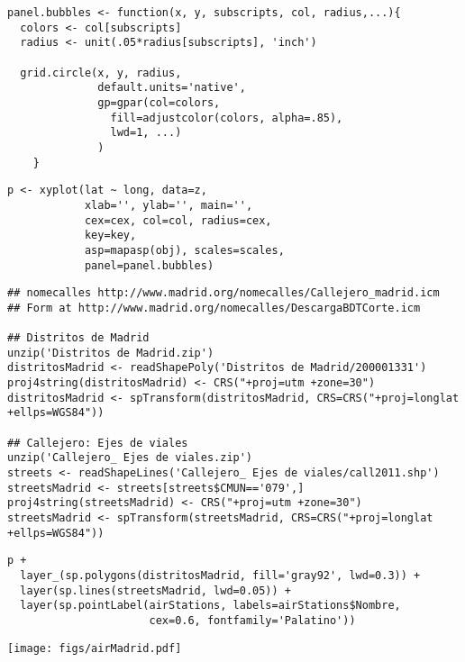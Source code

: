 \lstset{language=R}
\begin{lstlisting}
panel.bubbles <- function(x, y, subscripts, col, radius,...){
  colors <- col[subscripts]
  radius <- unit(.05*radius[subscripts], 'inch')

  grid.circle(x, y, radius,
              default.units='native',
              gp=gpar(col=colors,
                fill=adjustcolor(colors, alpha=.85),
                lwd=1, ...)
              )
    }
\end{lstlisting}


\lstset{language=R}
\begin{lstlisting}
p <- xyplot(lat ~ long, data=z,
            xlab='', ylab='', main='',
            cex=cex, col=col, radius=cex,
            key=key, 
            asp=mapasp(obj), scales=scales,
            panel=panel.bubbles)
\end{lstlisting}


\lstset{language=R}
\begin{lstlisting}
## nomecalles http://www.madrid.org/nomecalles/Callejero_madrid.icm
## Form at http://www.madrid.org/nomecalles/DescargaBDTCorte.icm

## Distritos de Madrid
unzip('Distritos de Madrid.zip')
distritosMadrid <- readShapePoly('Distritos de Madrid/200001331')
proj4string(distritosMadrid) <- CRS("+proj=utm +zone=30")
distritosMadrid <- spTransform(distritosMadrid, CRS=CRS("+proj=longlat +ellps=WGS84"))

## Callejero: Ejes de viales
unzip('Callejero_ Ejes de viales.zip')
streets <- readShapeLines('Callejero_ Ejes de viales/call2011.shp')
streetsMadrid <- streets[streets$CMUN=='079',]
proj4string(streetsMadrid) <- CRS("+proj=utm +zone=30")
streetsMadrid <- spTransform(streetsMadrid, CRS=CRS("+proj=longlat +ellps=WGS84"))
\end{lstlisting}




\lstset{language=R}
\begin{lstlisting}
p +
  layer_(sp.polygons(distritosMadrid, fill='gray92', lwd=0.3)) +
  layer(sp.lines(streetsMadrid, lwd=0.05)) +
  layer(sp.pointLabel(airStations, labels=airStations$Nombre,
                      cex=0.6, fontfamily='Palatino'))
\end{lstlisting}

\texttt{[image: figs/airMadrid.pdf]}

